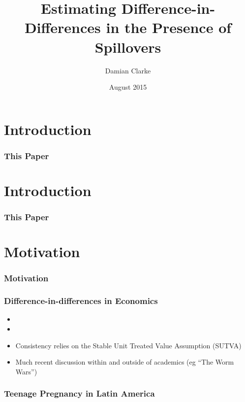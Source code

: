 \documentclass[10pt,letterpaper,subeqn]{beamer}
\title{Estimating Difference-in-Differences in the Presence of Spillovers}
\author{Damian Clarke\inst{\dag} }
\institute{\inst{\dag}  University of Oxford}
\date{August 2015}
\begin{document}
\begin{frame}
\titlepage
\end{frame}

\section{Introduction}
\begin{frame}[label=int1]
  \frametitle{This Paper}

\end{frame}

\section{Introduction}
\begin{frame}[label=int2]
  \frametitle{This Paper}

\end{frame}



\section{Motivation}
\begin{frame}[label=motivation]
  \frametitle{Motivation}

\end{frame}

\begin{frame}[label=DDM]
  \frametitle{Difference-in-differences in Economics}
\begin{itemize}
 \item 
 \item 
 \item Consistency relies on the Stable Unit Treated Value Assumption (SUTVA)
 \item Much recent discussion within and outside of academics (eg ``The Worm Wars'')
\end{itemize}
\end{frame}

\begin{frame}[label=teenPreg]
  \frametitle{Teenage Pregnancy in Latin America}

\end{frame}



\end{document}
